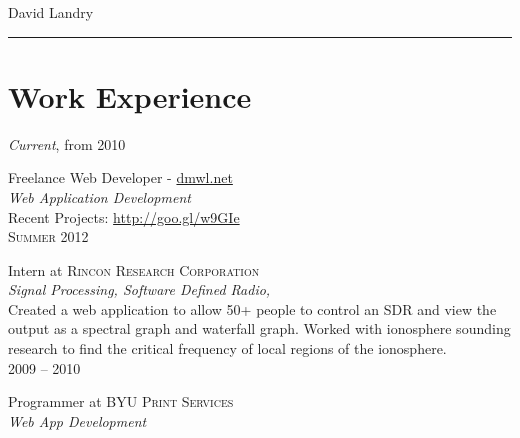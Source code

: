 \documentclass[10pt]{article}
\begin{document}
\color{text1} %

	\par{\centering
		{\sffamily\Large David Landry
	}\\	
{\color{white} \hrule} %
	
\begin{minipage}[t]{0.5\textwidth} %

	
\section{Work Experience}

	\raggedleft
	\emph{Current}, from \textsc{2010}\par

	\raggedright\large Freelance Web Developer - \href{http://dmwl.net}{dmwl.net} \\
	\emph{Web Application Development}\\[5pt]

  \normalsize{
  Recent Projects: \href{http://goo.gl/w9GIe}{http://goo.gl/w9GIe}
  }\\[10pt]

	\raggedleft
	\textsc{\normalsize Summer 2012}\par

	\raggedright
	\large Intern at \textsc{Rincon Research Corporation}\\
  \emph{Signal Processing, Software Defined Radio,  }\\[5pt]

  \normalsize{
    Created a web application to allow 50+ people to control an SDR and view
      the output as a spectral graph and waterfall graph.
    Worked with ionosphere sounding research to find the critical frequency
      of local regions of the ionosphere.
  }\\[10pt]

	\raggedleft
	\textsc{\normalsize 2009 -- 2010}\par

	\raggedright
	\large Programmer at \textsc{BYU Print Services}\\
  \emph{Web App Development}\\[5pt]


\end{minipage}}
\end{document}
